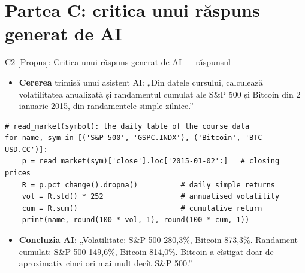 \section{Partea C: critica unui răspuns generat de AI}

\begin{frame}[fragile]{C2 [Propus]: Critica unui răspuns generat de AI --- răspunsul}
\itemsize{\footnotesize}
\begin{itemize}
    \item \textbf{Cererea} trimisă unui asistent AI: „Din datele cursului, calculează volatilitatea anualizată și randamentul cumulat ale S\&P 500 și Bitcoin din 2 ianuarie 2015, din randamentele simple zilnice.”
\end{itemize}
\begin{lstlisting}
# read_market(symbol): the daily table of the course data
for name, sym in [('S&P 500', 'GSPC.INDX'), ('Bitcoin', 'BTC-USD.CC')]:
    p = read_market(sym)['close'].loc['2015-01-02':]   # closing prices
    R = p.pct_change().dropna()          # daily simple returns
    vol = R.std() * 252                  # annualised volatility
    cum = R.sum()                        # cumulative return
    print(name, round(100 * vol, 1), round(100 * cum, 1))
\end{lstlisting}
\begin{itemize}
    \item \textbf{Concluzia AI}: „Volatilitate: S\&P 500 280{,}3\%, Bitcoin 873{,}3\%. Randament cumulat: S\&P 500 149{,}6\%, Bitcoin 814{,}0\%. Bitcoin a cîștigat doar de aproximativ cinci ori mai mult decît S\&P 500.”
\end{itemize}
\end{frame}

